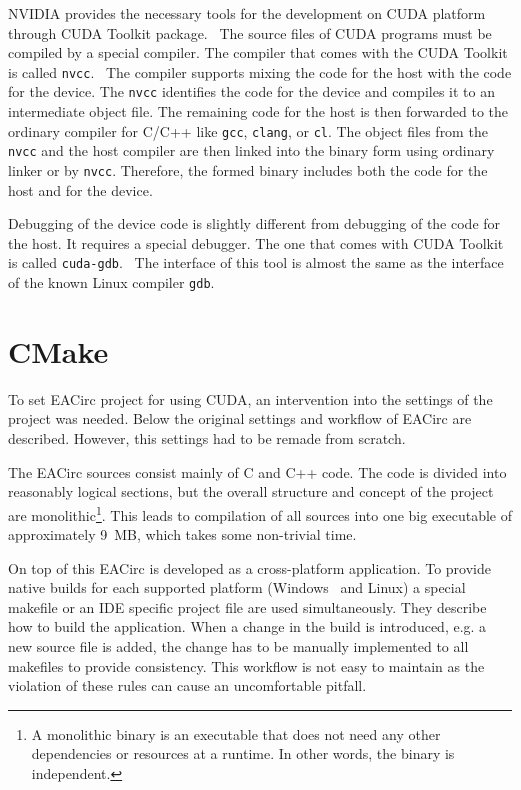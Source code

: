 \documentclass[12pt,twoside]{fithesis2}
\begin{document}
NVIDIA provides the necessary tools for the development on CUDA platform through CUDA Toolkit package.~\cite{cuda_toolkit} The source files of CUDA programs must be compiled by a special compiler. The compiler that comes with the CUDA Toolkit is called \texttt{nvcc}.~\cite{cuda_compiler} The compiler supports mixing the code for the host with the code for the device. The \texttt{nvcc} identifies the code for the device and compiles it to an intermediate object file. The remaining code for the host is then forwarded to the ordinary compiler for C/C++ like \texttt{gcc}, \texttt{clang}, or \texttt{cl}. The object files from the \texttt{nvcc} and the host compiler are then linked into the binary form using ordinary linker or by \texttt{nvcc}. Therefore, the formed binary includes both the code for the host and for the device.

Debugging of the device code is slightly different from debugging of the code for the host. It requires a special debugger. The one that comes with CUDA Toolkit is called \texttt{cuda-gdb}.~\cite{cuda_gdb} The interface of this tool is almost the same as the interface of the known Linux compiler \texttt{gdb}.





\chapter{CMake}

To set EACirc project for using CUDA, an intervention into the settings of the project was needed. Below the original settings and workflow of EACirc are described. However, this settings had to be remade from scratch.

The EACirc sources consist mainly of C and C++ code. The code is divided into reasonably logical sections, but the overall structure and concept of the project are monolithic\footnote{A monolithic binary is an executable that does not need any other dependencies or resources at a runtime. In other words, the binary is independent.}. This leads to compilation of all sources into one big executable of approximately 9~MB, which takes some non-trivial time.

On top of this EACirc is developed as a cross-platform application. To provide native builds for each supported platform (Windows~\cite{win} and Linux) a special makefile or an IDE specific project file are used simultaneously. They describe how to build the application. When a change in the build is introduced, e.g. a new source file is added, the change has to be manually implemented to all makefiles to provide consistency. This workflow is not easy to maintain as the violation of these rules can cause an uncomfortable pitfall.
\end{document}

